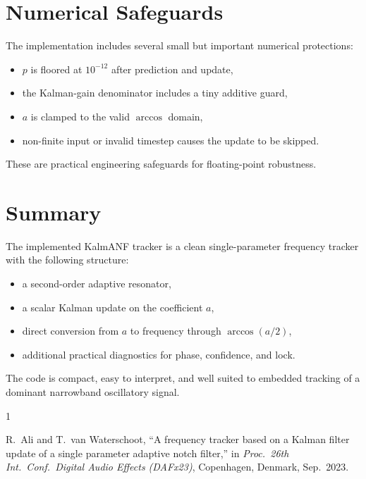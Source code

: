 \documentclass[conference]{IEEEtran}
\begin{document}
\section{Numerical Safeguards}\label{sec:numerical}

The implementation includes several small but important numerical protections:
\begin{itemize}[leftmargin=1.4em]
  \item $p$ is floored at $10^{-12}$ after prediction and update,
  \item the Kalman-gain denominator includes a tiny additive guard,
  \item $a$ is clamped to the valid $\arccos$ domain,
  \item non-finite input or invalid timestep causes the update to be skipped.
\end{itemize}

These are practical engineering safeguards for floating-point robustness.

\section{Summary}

The implemented KalmANF tracker is a clean single-parameter frequency tracker
with the following structure:
\begin{itemize}[leftmargin=1.4em]
  \item a second-order adaptive resonator,
  \item a scalar Kalman update on the coefficient $a$,
  \item direct conversion from $a$ to frequency through $\arccos(a/2)$,
  \item additional practical diagnostics for phase, confidence, and lock.
\end{itemize}

The code is compact, easy to interpret, and well suited to embedded tracking
of a dominant narrowband oscillatory signal.

\begin{thebibliography}{1}

R.~Ali and T.~van Waterschoot,
``A frequency tracker based on a Kalman filter update of a single parameter
adaptive notch filter,''
in \emph{Proc.\ 26th Int.\ Conf.\ Digital Audio Effects (DAFx23)},
Copenhagen, Denmark, Sep.\ 2023.

\end{thebibliography}
\end{document}
